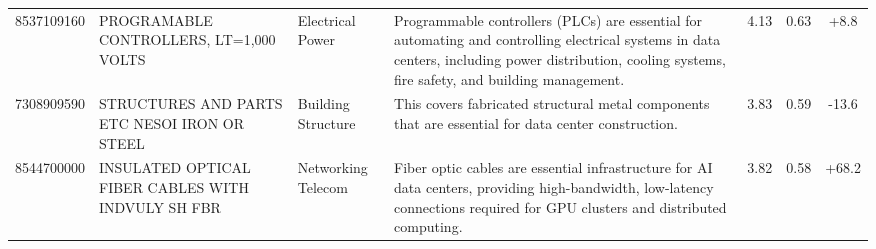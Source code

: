 \begin{landscape}
\begin{table}[htbp]
\begin{tabular}{lp{4cm}lp{6cm}ccc}
8537109160 & {\scriptsize PROGRAMABLE CONTROLLERS, LT=1,000 VOLTS} & Electrical Power & {\scriptsize Programmable controllers (PLCs) are essential for automating and controlling electrical systems in data centers, including power distribution, cooling systems, fire safety, and building management.} & 4.13 & 0.63 & +8.8 \\
7308909590 & {\scriptsize STRUCTURES AND PARTS ETC NESOI IRON OR STEEL} & Building Structure & {\scriptsize This covers fabricated structural metal components that are essential for data center construction.} & 3.83 & 0.59 & -13.6 \\
8544700000 & {\scriptsize INSULATED OPTICAL FIBER CABLES WITH INDVULY SH FBR} & Networking Telecom & {\scriptsize Fiber optic cables are essential infrastructure for AI data centers, providing high-bandwidth, low-latency connections required for GPU clusters and distributed computing.} & 3.82 & 0.58 & +68.2 \\
\bottomrule
\end{tabular}
\end{table}
\end{landscape}

